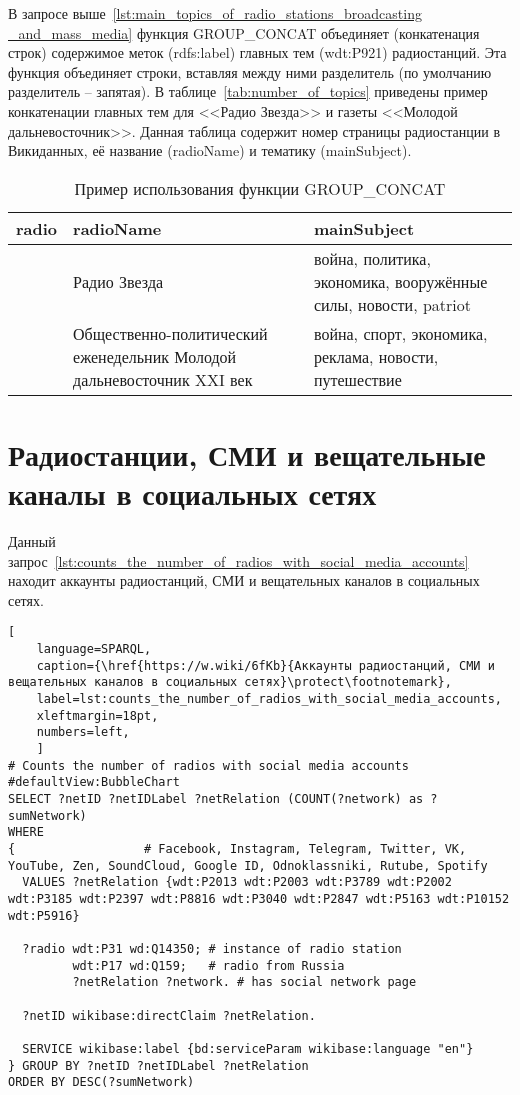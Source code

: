 \newpage

В запросе выше~\ref{lst:main_topics_of_radio_stations_broadcasting _and_mass_media} функция GROUP\_CONCAT объединяет (конкатенация строк) содержимое меток (rdfs:label) главных тем (wdt:P921) радиостанций. Эта функция объединяет строки, вставляя между ними разделитель (по умолчанию разделитель -- запятая). В таблице~\ref{tab:number_of_topics} приведены пример конкатенации главных тем для <<Радио Звезда>> и газеты <<Молодой дальневосточник>>. Данная таблица содержит номер страницы радиостанции в Викиданных, её название (radioName) и тематику (mainSubject).

\begin{table}[ht]
\centering
\caption{Пример использования функции GROUP\_CONCAT}
\begin{tabular}{|p{14em}|p{10em}|p{10em}|}
\hline
radio & radioName & mainSubject \\
\hline
\href{Q4387399} & Радио Звезда & война, политика, экономика, вооружённые силы, новости, patriot \\
\hline
\href{Q30909585} & Общественно-политический еженедельник Молодой дальневосточник XXI век & война, спорт, экономика, реклама, новости, путешествие \\
\hline
\end{tabular}
\label{tab:example_of_using_the_function}
\end{table}

\newpage

\section{Радиостанции, СМИ и вещательные каналы в социальных сетях}

Данный запрос~\ref{lst:counts_the_number_of_radios_with_social_media_accounts} находит аккаунты радиостанций, СМИ и вещательных каналов в социальных сетях.

\begin{lstlisting}[ 
    language=SPARQL,
    caption={\href{https://w.wiki/6fKb}{Аккаунты радиостанций, СМИ и вещательных каналов в социальных сетях}\protect\footnotemark},
    label=lst:counts_the_number_of_radios_with_social_media_accounts,
    xleftmargin=18pt,
    numbers=left,
    ]
# Counts the number of radios with social media accounts
#defaultView:BubbleChart
SELECT ?netID ?netIDLabel ?netRelation (COUNT(?network) as ?sumNetwork)
WHERE
{                  # Facebook, Instagram, Telegram, Twitter, VK, YouTube, Zen, SoundCloud, Google ID, Odnoklassniki, Rutube, Spotify
  VALUES ?netRelation {wdt:P2013 wdt:P2003 wdt:P3789 wdt:P2002 wdt:P3185 wdt:P2397 wdt:P8816 wdt:P3040 wdt:P2847 wdt:P5163 wdt:P10152 wdt:P5916}
  
  ?radio wdt:P31 wd:Q14350; # instance of radio station
         wdt:P17 wd:Q159;   # radio from Russia
         ?netRelation ?network. # has social network page

  ?netID wikibase:directClaim ?netRelation.
  
  SERVICE wikibase:label {bd:serviceParam wikibase:language "en"}
} GROUP BY ?netID ?netIDLabel ?netRelation 
ORDER BY DESC(?sumNetwork)\end{lstlisting}%

